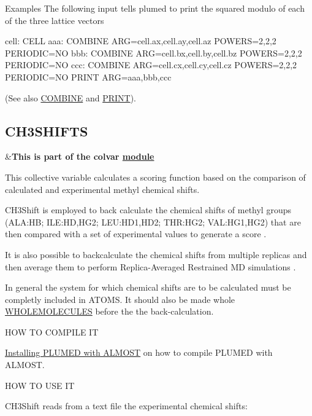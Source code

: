 \begin{DoxyParagraph}{Examples}
The following input tells plumed to print the squared modulo of each of the three lattice vectors \begin{DoxyVerb}cell: CELL
aaa:    COMBINE ARG=cell.ax,cell.ay,cell.az POWERS=2,2,2 PERIODIC=NO
bbb:    COMBINE ARG=cell.bx,cell.by,cell.bz POWERS=2,2,2 PERIODIC=NO
ccc:    COMBINE ARG=cell.cx,cell.cy,cell.cz POWERS=2,2,2 PERIODIC=NO
PRINT ARG=aaa,bbb,ccc
\end{DoxyVerb}
 (See also \hyperlink{COMBINE}{C\+O\+M\+B\+I\+N\+E} and \hyperlink{PRINT}{P\+R\+I\+N\+T}). 
\end{DoxyParagraph}
\hypertarget{CH3SHIFTS}{}\subsection{C\+H3\+S\+H\+I\+F\+T\+S}\label{CH3SHIFTS}
\begin{TabularC}{2}
\hline
&{\bfseries  This is part of the colvar \hyperlink{mymodules}{module }}   \\
\end{TabularC}
This collective variable calculates a scoring function based on the comparison of calculated and experimental methyl chemical shifts.

C\+H3\+Shift \cite{Sahakyan:2011bn} is employed to back calculate the chemical shifts of methyl groups (A\+L\+A\+:H\+B; I\+L\+E\+:H\+D,H\+G2; L\+E\+U\+:H\+D1,H\+D2; T\+H\+R\+:H\+G2; V\+A\+L\+:H\+G1,H\+G2) that are then compared with a set of experimental values to generate a score \cite{Robustelli:2010dn} \cite{Granata:2013dk}.

It is also possible to backcalculate the chemical shifts from multiple replicas and then average them to perform Replica-\/\+Averaged Restrained M\+D simulations \cite{Camilloni:2012je} \cite{Camilloni:2013hs}.

In general the system for which chemical shifts are to be calculated must be completly included in A\+T\+O\+M\+S. It should also be made whole \hyperlink{WHOLEMOLECULES}{W\+H\+O\+L\+E\+M\+O\+L\+E\+C\+U\+L\+E\+S} before the the back-\/calculation.

H\+O\+W T\+O C\+O\+M\+P\+I\+L\+E I\+T

\hyperlink{_installation_installingalmost}{Installing P\+L\+U\+M\+E\+D with A\+L\+M\+O\+S\+T} on how to compile P\+L\+U\+M\+E\+D with A\+L\+M\+O\+S\+T.

H\+O\+W T\+O U\+S\+E I\+T

C\+H3\+Shift reads from a text file the experimental chemical shifts\+:

